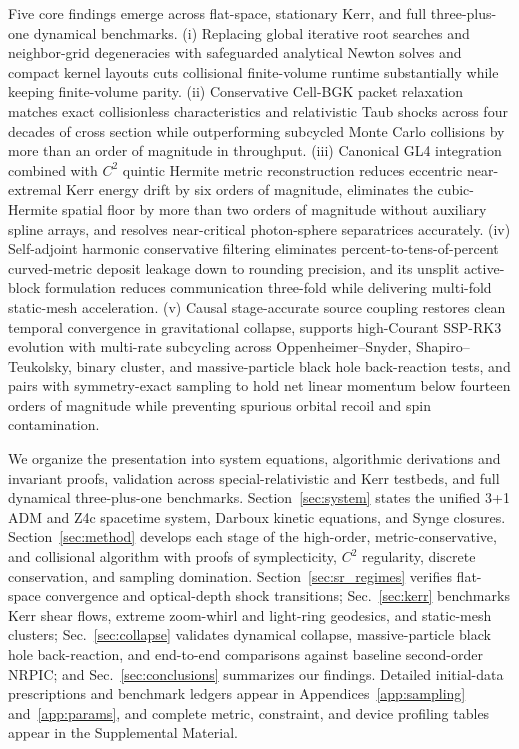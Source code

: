 Five core findings emerge across flat-space, stationary Kerr, and full three-plus-one dynamical benchmarks. (i) Replacing global iterative root searches and neighbor-grid degeneracies with safeguarded analytical Newton solves and compact kernel layouts cuts collisional finite-volume runtime substantially while keeping finite-volume parity. (ii) Conservative Cell-BGK packet relaxation matches exact collisionless characteristics and relativistic Taub shocks across four decades of cross section while outperforming subcycled Monte Carlo collisions by more than an order of magnitude in throughput. (iii) Canonical GL4 integration combined with $C^2$ quintic Hermite metric reconstruction reduces eccentric near-extremal Kerr energy drift by six orders of magnitude, eliminates the cubic-Hermite spatial floor by more than two orders of magnitude without auxiliary spline arrays, and resolves near-critical photon-sphere separatrices accurately. (iv) Self-adjoint harmonic conservative filtering eliminates percent-to-tens-of-percent curved-metric deposit leakage down to rounding precision, and its unsplit active-block formulation reduces communication three-fold while delivering multi-fold static-mesh acceleration. (v) Causal stage-accurate source coupling restores clean temporal convergence in gravitational collapse, supports high-Courant SSP-RK3 evolution with multi-rate subcycling across Oppenheimer--Snyder, Shapiro--Teukolsky, binary cluster, and massive-particle black hole back-reaction tests, and pairs with symmetry-exact sampling to hold net linear momentum below fourteen orders of magnitude while preventing spurious orbital recoil and spin contamination.

We organize the presentation into system equations, algorithmic derivations and invariant proofs, validation across special-relativistic and Kerr testbeds, and full dynamical three-plus-one benchmarks. Section~\ref{sec:system} states the unified 3+1 ADM and Z4c spacetime system, Darboux kinetic equations, and Synge closures. Section~\ref{sec:method} develops each stage of the high-order, metric-conservative, and collisional algorithm with proofs of symplecticity, $C^2$ regularity, discrete conservation, and sampling domination. Section~\ref{sec:sr_regimes} verifies flat-space convergence and optical-depth shock transitions; Sec.~\ref{sec:kerr} benchmarks Kerr shear flows, extreme zoom-whirl and light-ring geodesics, and static-mesh clusters; Sec.~\ref{sec:collapse} validates dynamical collapse, massive-particle black hole back-reaction, and end-to-end comparisons against baseline second-order NRPIC; and Sec.~\ref{sec:conclusions} summarizes our findings. Detailed initial-data prescriptions and benchmark ledgers appear in Appendices~\ref{app:sampling} and~\ref{app:params}, and complete metric, constraint, and device profiling tables appear in the Supplemental Material.
